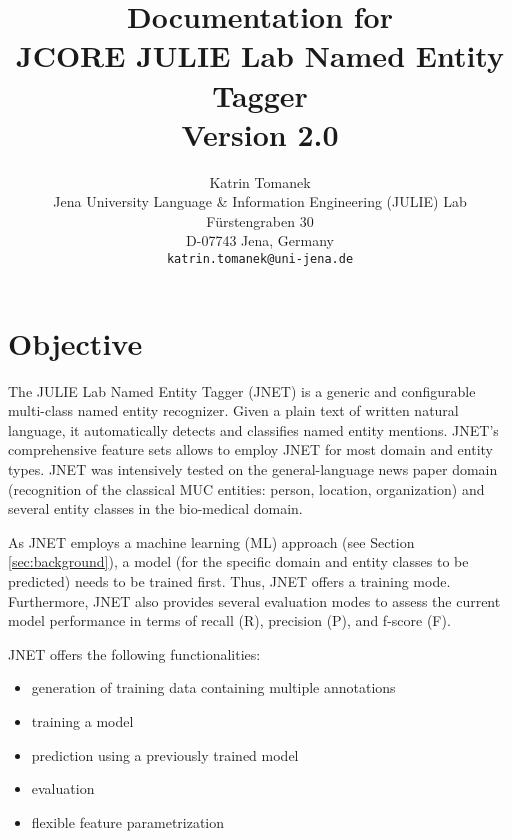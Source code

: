 \documentclass[11pt,a4paper,halfparskip]{scrartcl}
\begin{document}
\title{\small{Documentation for}\\\huge JCORE JULIE Lab Named Entity Tagger\\\vspace{3mm}\small{Version 2.0}}


\author{\normalsize Katrin Tomanek\\
  \normalsize  Jena University Language \& Information Engineering (JULIE) Lab\\
  \normalsize F\"urstengraben 30 \\
  \normalsize D-07743 Jena, Germany\\
  {\normalsize \tt katrin.tomanek@uni-jena.de} }

\date{}

\maketitle



\section{Objective}
\label{sec_objective}


The JULIE Lab Named Entity Tagger (JNET) is a generic and configurable
multi-class named entity recognizer. Given a plain text of written
natural language, it automatically detects and classifies named entity
mentions. JNET's comprehensive feature sets allows to employ JNET for
most domain and entity types. JNET was intensively tested on the
general-language news paper domain (recognition of the classical MUC
entities: person, location, organization) and several entity classes
in the bio-medical domain.

As JNET employs a machine learning (ML) approach (see Section
\ref{sec:background}), a model (for the specific domain and entity
classes to be predicted) needs to be trained first. Thus, JNET offers
a training mode. Furthermore, JNET also provides several evaluation
modes to assess the current model performance in terms of recall (R),
precision (P), and f-score (F).
 
JNET offers the following functionalities:
\begin{itemize}
\item generation of training data containing multiple annotations
\item training a model
\item prediction using a previously trained model
\item evaluation
\item flexible feature parametrization
\end{itemize}
\end{document}
